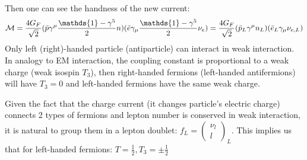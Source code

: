 Then one can see the handness of the new current:
\begin{equation}
    \CM = \frac{4G_F}{\sqrt{2}}(\bar{p} \gamma^\mu\frac{\mathds{1} - \gamma^5}{2} n) (\bar{e} \gamma_\mu\frac{\mathds{1} - \gamma^5}{2} \nu_e) 
    = \frac{4G_F}{\sqrt{2}}(\bar{p}_L \gamma^\mu n_L)(\bar{e}_L \gamma_\mu \nu_{e,L})
\end{equation}
Only left (right)-handed particle (antiparticle) can interact in weak interaction.
In analogy to EM interaction, the coupling constant is proportional to a weak
charge (weak isospin $T_3$), then right-handed fermions (left-handed antifermions) 
will have $T_3 = 0$ and left-handed fermions have the same weak charge. 

Given the fact that the charge current (it changes particle's electric charge) 
connects 2 types of fermions and lepton number is conserved in weak interaction, 
it is natural to group them in a lepton doublet: $f_L = \begin{pmatrix} \nu_l \\ l \end{pmatrix}_L$.
This implies us that for left-handed fermions: $T=\frac{1}{2}, T_3 = \pm\frac{1}{2}$ 

